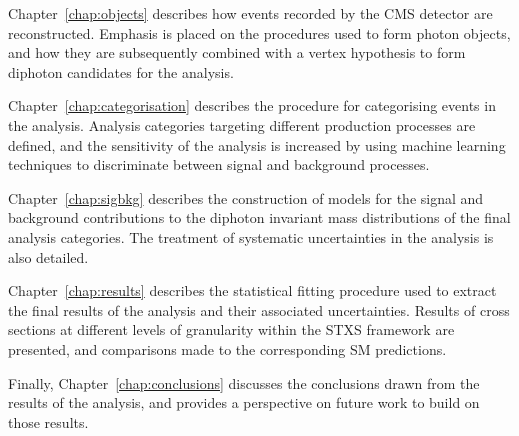 Chapter~\ref{chap:objects} describes how events recorded by the CMS detector are reconstructed.
Emphasis is placed on the procedures used to form photon objects, 
and how they are subsequently combined with a vertex hypothesis to form diphoton candidates 
for the \Hgg analysis.

Chapter~\ref{chap:categorisation} describes the procedure for categorising events in the \Hgg analysis.
Analysis categories targeting different production processes are defined, 
and the sensitivity of the analysis is increased by 
using machine learning techniques to discriminate between signal and background processes.

Chapter~\ref{chap:sigbkg} describes the construction of models for the signal and background 
contributions to the diphoton invariant mass distributions of the final analysis categories.
The treatment of systematic uncertainties in the analysis is also detailed.

Chapter~\ref{chap:results} describes the statistical fitting procedure used 
to extract the final results of the analysis and their associated uncertainties.
Results of cross sections at different levels of granularity within the STXS framework 
are presented, and comparisons made to the corresponding SM predictions.

Finally, Chapter~\ref{chap:conclusions} discusses the conclusions drawn from the results of the analysis, 
and provides a perspective on future work to build on those results.
